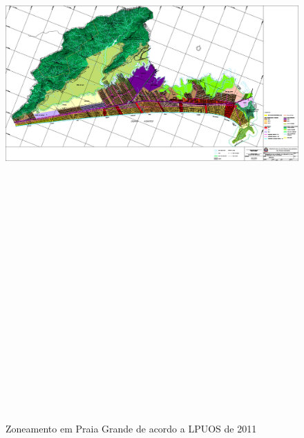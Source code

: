 	\begin{landscape}
		\begin{figure}[h]
			\centering
			\caption{Zoneamento em Praia Grande de acordo a LPUOS de 2011}
			\includegraphics[width=25cm,height=25cm,keepaspectratio]{img/3788_Carta_Oficial_Zoneamento.jpg}
			\label{mapa_zoneamento}
		\end{figure}
	\end{landscape}
	
